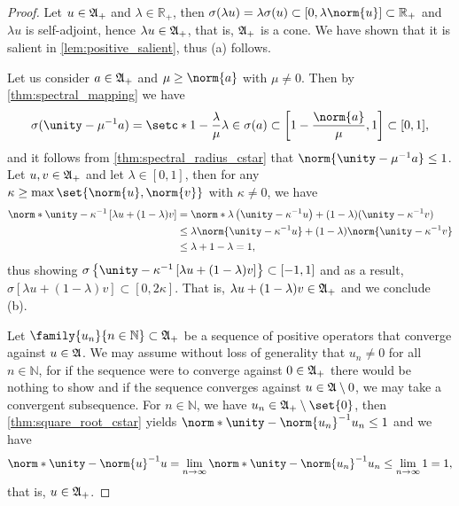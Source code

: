 \begin{proof}
    Let \(u \in \mathfrak{A}_+\) and \(\lambda \in \mathbb{R}_+\), then \(\sigma(\lambda u) = \lambda \sigma(u) \subset [0, \lambda \norm{u}] \subset \mathbb{R}_+\) and \(\lambda u\) is self-adjoint, hence \(\lambda u \in \mathfrak{A}_+\), that is, \(\mathfrak{A}_+\) is a cone. We have shown that it is salient in \cref{lem:positive_salient}, thus (a) follows.

    Let us consider \(a \in \mathfrak{A}_+\) and \(\mu \geq \norm{a}\) with \(\mu \neq 0\). Then by \cref{thm:spectral_mapping} we have
    \begin{equation*}
        \sigma(\unity - \mu^{-1} a) = \setc*{1 - \frac{\lambda}{\mu}}{\lambda \in \sigma(a)} \subset \left[1 - \frac{\norm{a}}{\mu}, 1\right] \subset [0, 1],
    \end{equation*}
    and it follows from \cref{thm:spectral_radius_cstar} that \(\norm{\unity - \mu^{-1} a} \leq 1\). Let \(u,v \in \mathfrak{A}_+\) and let \(\lambda \in [0,1]\), then for any \(\kappa \geq \max\set{\norm{u}, \norm{v}}\) with \(\kappa \neq 0\), we have
    \begin{align*}
        \norm*{\unity - \kappa^{-1}\left[\lambda u + (1 - \lambda)v\right]}
        &= \norm*{\lambda\left(\unity - \kappa^{-1} u\right) + (1- \lambda) (\unity - \kappa^{-1}v)}\\
        &\leq \lambda \norm{\unity - \kappa^{-1}u} + (1 - \lambda) \norm{\unity - \kappa^{-1} v}\\
        &\leq \lambda + 1 - \lambda = 1,
    \end{align*}
    thus showing \(\sigma\left\{\unity - \kappa^{-1}\left[\lambda u + (1 - \lambda)v\right]\right\} \subset [-1,1]\) and as a result, \(\sigma\left[\lambda u + (1 - \lambda)v\right] \subset [0, 2 \kappa]\). That is, \(\lambda u + (1 - \lambda)v \in \mathfrak{A}_+\) and we conclude (b).

    Let \(\family{u_n}{n \in \mathbb{N}} \subset \algebra{A}_+\) be a sequence of positive operators that converge against \(u \in \mathfrak{A}\). We may assume without loss of generality that \(u_n \neq 0\) for all \(n \in \mathbb{N}\), for if the sequence were to converge against \(0 \in \mathfrak{A}_+\) there would be nothing to show and if the sequence converges against \(u \in \mathfrak{A}\setminus{0}\), we may take a convergent subsequence. For \(n \in \mathbb{N}\), we have \(u_n \in \algebra{A}_+\setminus\set{0}\), then \cref{thm:square_root_cstar} yields \(\norm*{\unity - \norm{u_n}^{-1}u_n}\leq 1\) and we have
    \begin{equation*}
        \norm*{\unity - \norm{u}^{-1}u} = \lim_{n \to \infty} \norm*{\unity - \norm{u_n}^{-1}u_n} \leq \lim_{n \to \infty} 1 = 1,
    \end{equation*}
    that is, \(u \in \mathfrak{A}_+\).
\end{proof}
